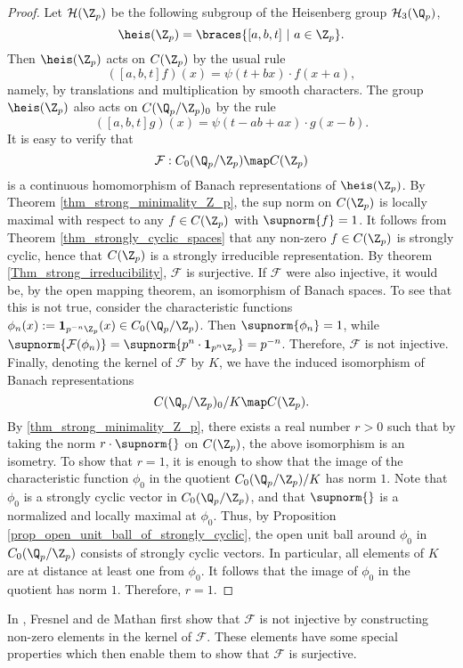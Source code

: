     \begin{proof}
    Let $\mathcal{H}(\Z_p)$ be the following subgroup of the Heisenberg group $\mathcal{H}_3(\Q_p)$,
    \[\heis(\Z_p)=\braces{[a,b,t]\ |\ a\in\Z_p}.\]
    Then $\heis(\Z_p)$ acts on $C(\Z_p)$ by the usual rule
    \[([a,b,t]f)(x)=\psi(t+bx)\cdot f(x+a),\]
    namely, by translations and multiplication by smooth characters.
    The group $\heis(\Z_p)$ also acts on $C(\Q_p/\Z_p)_0$ by the rule
    \[([a,b,t]g)(x)=\psi(t-ab+ax)\cdot g(x-b).\]
    It is easy to verify that \[\mathcal{F}:C_0(\Q_p/\Z_p)\map C(\Z_p)\]
    is a continuous homomorphism of Banach representations of $\heis(\Z_p)$.
    By Theorem \ref{thm_strong_minimality_Z_p}, the sup norm on $C(\Z_p)$ is locally maximal with respect to any $f\in C(\Z_p)$ with $\supnorm{f}=1$.
    It follows from Theorem \ref{thm_strongly_cyclic_spaces} that any non-zero $f\in C(\Z_p)$ is strongly cyclic, hence that $C(\Z_p)$ is a strongly irreducible representation.
    By theorem \ref{Thm_strong_irreducibility}, $\mathcal{F}$ is surjective.
    If $\mathcal{F}$ were also injective, it would be, by the open mapping theorem, an isomorphism of Banach spaces.
    To see that this is not true, consider the characteristic functions $\phi_n(x):=\textbf{1}_{p^{-n}\Z_p}(x)\in C_0(\Q_p/\Z_p)$.
    Then $\supnorm{\phi_n}=1$, while $\supnorm{\mathcal{F}(\phi_n)}=\supnorm{p^n\cdot\textbf{1}_{p^n\Z_p}}=p^{-n}$.
    Therefore, $\mathcal{F}$ is not injective.
    Finally, denoting the kernel of $\mathcal{F}$ by $K$, we have the induced isomorphism of Banach representations
    \[C(\Q_p/\Z_p)_0/K\map C(\Z_p).\]
    By \ref{thm_strong_minimality_Z_p}, there exists a real number $r>0$ such that by taking the norm $r\cdot \supnorm{}$ on $C(\Z_p)$, the above isomorphism is an isometry.
    To show that $r=1$, it is enough to show that the image of the characteristic function $\phi_0$ in the quotient $C_0(\Q_p/\Z_p)/K$ has norm $1$.
    Note that $\phi_0$ is a strongly cyclic vector in $C_0(\Q_p/\Z_p)$, and that $\supnorm{}$ is a normalized and locally maximal at $\phi_0$.
    Thus, by Proposition \ref{prop_open_unit_ball_of_strongly_cyclic}, the open unit ball around $\phi_0$ in $C_0(\Q_p/\Z_p)$ consists of strongly cyclic vectors.
    In particular, all elements of $K$ are at distance at least one from $\phi_0$.
    It follows that the image of $\phi_0$ in the quotient has norm $1$.
    Therefore, $r=1$.
    \end{proof}
    
    \begin{remark}
    In \cite{demathan}, Fresnel and de Mathan first show that $\mathcal{F}$ is not injective by constructing non-zero elements in the kernel of $\mathcal{F}$.
    These elements have some special properties which then enable them to show that $\mathcal{F}$ is surjective.
    \end{remark} 

